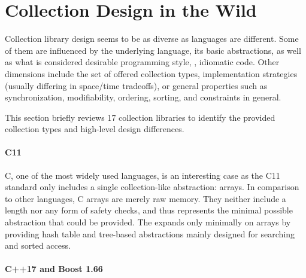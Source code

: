 \documentclass[sigconf, 10pt]{acmart}
\begin{document}
\section{Collection Design in the Wild}
\label{sec:col-wild}


Collection library design seems to be as diverse as languages are different.
Some of them are influenced by the underlying language,
its basic abstractions,
as well as what is considered desirable programming style, \ie, idiomatic code.
Other dimensions include the set of offered collection types,
implementation strategies (usually differing in space/time tradeoffs),
or general properties such as synchronization, modifiability, ordering,
sorting, and constraints in general.

This section briefly reviews 17 collection libraries
to identify the provided collection types
and high-level design differences.

\paragraph{C11}


C, one of the most widely used languages, is an interesting case as the C11 standard only includes a single collection-like abstraction: arrays.
In comparison to other languages, C arrays are merely raw memory.
They neither include a length nor any form of safety checks,
and thus represents the minimal possible abstraction that could be provided.
The 
expands only minimally on arrays
by providing hash table and tree-based abstractions 
mainly designed for searching and sorted access.

\paragraph{C++17 and Boost 1.66}

% 
% 
\end{document}
